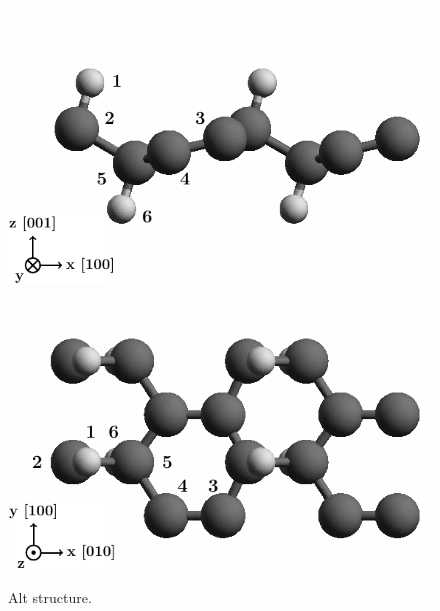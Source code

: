 \documentclass[prb,11pt,tightenlines,twocolumn,aps]{revtex4-1}
\begin{document}
\begin{figure}[ht!]
    \centering
    \includegraphics[width=\linewidth]{figures/altstruc2}
    \\
    \includegraphics[width=\linewidth]{figures/altstruc1}
    \caption{Alt structure.}
    \label{fig:alt-struc}
\end{figure}
\end{document}
